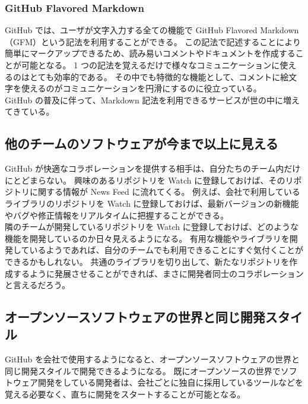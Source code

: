 \subsubsection{GitHub Flavored Markdown}
GitHub では、ユーザが文字入力する全ての機能で GitHub Flavored Markdown（GFM）という記法を利用することができる。
この記法で記述することにより簡単にマークアップできるため、読み易いコメントやドキュメントを作成することが可能となる。
1 つの記法を覚えるだけで様々なコミュニケーションに使えるのはとても効率的である。\enlargethispage{0.30zw}
その中でも特徴的な機能として、コメントに絵文字を使えるのがコミュニケーションを円滑にするのに役立っている。\\

GitHub の普及に伴って、Markdown 記法を利用できるサービスが世の中に増えてきている。
\subsection{他のチームのソフトウェアが今まで以上に見える}
GitHub が快適なコラボレーションを提供する相手は、自分たちのチーム内だけにとどまらない。
興味のあるリポジトリを Watch に登録しておけば、そのリポジトリに関する情報が News Feed に流れてくる。
例えば、会社で利用しているライブラリのリポジトリを Watch に登録しておけば、最新バージョンの新機能やバグや修正情報をリアルタイムに把握することができる。\\

隣のチームが開発しているリポジトリを Watch に登録しておけば、どのような機能を開発しているのか日々見えるようになる。
有用な機能やライブラリを開発しているようであれば、自分のチームでも利用できることにすぐ気付くことができるかもしれない。
共通のライブラリを切り出して、新たなリポジトリを作成するように発展させることができれば、まさに開発者同士のコラボレーションと言えるだろう。
\subsection{オープンソースソフトウェアの世界と同じ開発スタイル}
GitHub を会社で使用するようになると、オープンソースソフトウェアの世界と同じ開発スタイルで開発できるようになる。
既にオープンソースの世界でソフトウェア開発をしている開発者は、会社ごとに独自に採用しているツールなどを覚える必要なく、直ちに開発をスタートすることが可能となる。\\

